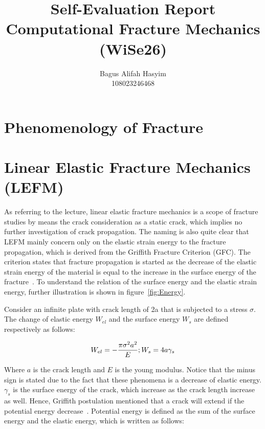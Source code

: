 \documentclass[12pt]{article}
\title{Self-Evaluation Report \\ \large Computational Fracture Mechanics (WiSe26)}
\author{Bagus Alifah Hasyim \\ 108023246468}
\date{}
\begin{document}
\maketitle

\section*{Phenomenology of Fracture}

\section{Linear Elastic Fracture Mechanics (LEFM)}

\hspace{1em} As referring to the lecture, linear elastic fracture mechanics is a scope of fracture studies by means the crack consideration as a static crack, 
which implies no further investigation of crack propagation. The naming is also quite clear that LEFM mainly concern only on the elastic strain energy to the
fracture propagation, which is derived from the Griffith Fracture Criterion (GFC). The criterion states that fracture propagation is started as the decrease 
of the elastic strain energy of the material is equal to the increase in the surface energy of the fracture~\cite{Guo.2021}. To understand the relation of the
surface energy and the elastic strain energy, further illustration is shown in figure~\ref{fig:Energy}.

\hspace{1em} Consider an infinite plate with crack length of 2a that is subjected to a stress $\sigma$. 
The change of elastic energy $W_{el}$ and the surface energy $W_s$ are defined respectively as follows:

\begin{equation}
  W_{el} = -\frac{\pi \sigma^2 a^2}{E}; \space \space W_{s} = 4a \gamma_s 
  \label{eq:ElasticEnergy}
\end{equation}

Where $a$ is the crack length and $E$ is the young modulus. Notice that the minus sign is stated due to the fact that these phenomena is a decrease of elastic energy.
$\gamma_s$ is the surface energy of the crack, which increase as the crack length increase as well. Hence, Griffith postulation mentioned that 
a crack will extend if the potential energy decrease~\cite{Janssen.2002}. Potential energy is defined as the sum of the surface energy and the elastic energy, which is written as follows:
\end{document}
